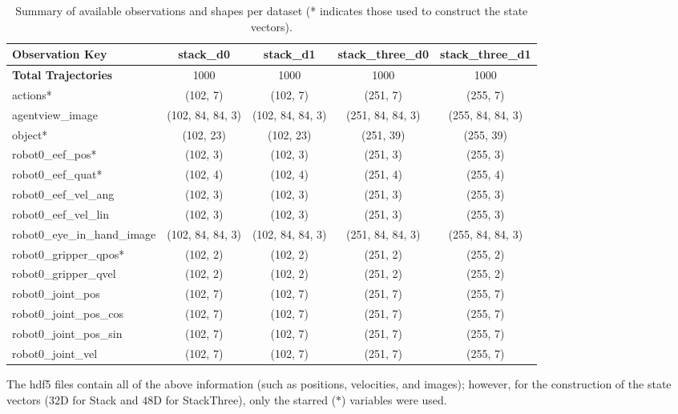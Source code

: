 \documentclass[11pt,a4paper]{article}
\begin{document}
\begin{table}[htbp]
\centering
\footnotesize
\caption{Summary of available observations and shapes per dataset (* indicates those used to construct the state vectors).}
\label{tab:datasets}
\begin{tabular}{|l|c|c|c|c|}
\hline
\textbf{Observation Key} & \textbf{stack\_d0} & \textbf{stack\_d1} & \textbf{stack\_three\_d0} & \textbf{stack\_three\_d1} \\ \hline
\textbf{Total Trajectories} & 1000 & 1000 & 1000 & 1000 \\ \hline
actions* & (102, 7) & (102, 7) & (251, 7) & (255, 7) \\ \hline
agentview\_image & (102, 84, 84, 3) & (102, 84, 84, 3) & (251, 84, 84, 3) & (255, 84, 84, 3) \\ \hline
object* & (102, 23) & (102, 23) & (251, 39) & (255, 39) \\ \hline
robot0\_eef\_pos* & (102, 3) & (102, 3) & (251, 3) & (255, 3) \\ \hline
robot0\_eef\_quat* & (102, 4) & (102, 4) & (251, 4) & (255, 4) \\ \hline
robot0\_eef\_vel\_ang & (102, 3) & (102, 3) & (251, 3) & (255, 3) \\ \hline
robot0\_eef\_vel\_lin & (102, 3) & (102, 3) & (251, 3) & (255, 3) \\ \hline
robot0\_eye\_in\_hand\_image & (102, 84, 84, 3) & (102, 84, 84, 3) & (251, 84, 84, 3) & (255, 84, 84, 3) \\ \hline
robot0\_gripper\_qpos* & (102, 2) & (102, 2) & (251, 2) & (255, 2) \\ \hline
robot0\_gripper\_qvel & (102, 2) & (102, 2) & (251, 2) & (255, 2) \\ \hline
robot0\_joint\_pos & (102, 7) & (102, 7) & (251, 7) & (255, 7) \\ \hline
robot0\_joint\_pos\_cos & (102, 7) & (102, 7) & (251, 7) & (255, 7) \\ \hline
robot0\_joint\_pos\_sin & (102, 7) & (102, 7) & (251, 7) & (255, 7) \\ \hline
robot0\_joint\_vel & (102, 7) & (102, 7) & (251, 7) & (255, 7) \\ \hline
\end{tabular}
\end{table}

The hdf5 files contain all of the above information (such as positions, velocities, and images); however, for the construction of the state vectors ($32$D for Stack and $48$D for StackThree), only the starred ($*$) variables were used.
\pagebreak
\end{document}
